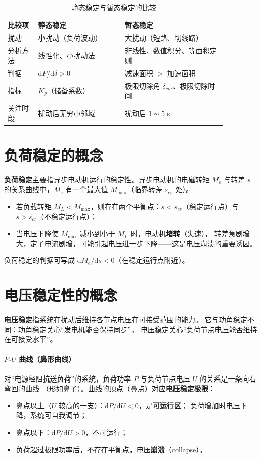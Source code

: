 \begin{table}[htbp]
  \centering
  \caption{静态稳定与暂态稳定的比较}
  \small
  \begin{tabular}{@{}p{0.12\linewidth}p{0.34\linewidth}p{0.40\linewidth}@{}}
    \toprule
    比较项 & 静态稳定 & 暂态稳定 \\
    \midrule
    扰动 & 小扰动（负荷波动） & 大扰动（短路、切线路） \\
    分析方法 & 线性化、小扰动法 & 非线性、数值积分、等面积定则 \\
    判据 & $\mathrm{d}P/\mathrm{d}\delta>0$ & 减速面积 $>$ 加速面积 \\
    指标 & $K_p$（储备系数） & 极限切除角 $\delta_{cm}$、极限切除时间 \\
    关注时段 & 扰动后无穷小邻域 & 扰动后 $1\sim5$ s \\
    \bottomrule
  \end{tabular}
\end{table}

\section{负荷稳定的概念}

\textbf{负荷稳定}主要指异步电动机运行的稳定性。异步电动机的电磁转矩 $M_e$ 与转差 $s$
的关系曲线中，$M_e$ 有一个最大值 $M_{\max}$（临界转差 $s_{cr}$ 处）。
\begin{itemize}
  \item 若负载转矩 $M_L<M_{\max}$，则存在两个平衡点：$s<s_{cr}$（稳定运行点）与
        $s>s_{cr}$（不稳定运行点）；
  \item 当电压下降使 $M_{\max}$ 减小到小于 $M_L$ 时，电动机\textbf{堵转}（失速），
        转差急剧增大，定子电流剧增，可能引起电压进一步下降——这是电压崩溃的重要诱因。
\end{itemize}
负荷稳定的判据可写成 $\mathrm{d}M_e/\mathrm{d}s<0$（在稳定运行点附近）。

\section{电压稳定性的概念}

\textbf{电压稳定}指系统在扰动后维持各节点电压在可接受范围的能力。
它与功角稳定不同：功角稳定关心“发电机能否保持同步”，
电压稳定关心“负荷节点电压能否维持在可接受水平”。

\paragraph{$P$-$U$ 曲线（鼻形曲线）}
对“电源经阻抗送负荷”的系统，负荷功率 $P$ 与负荷节点电压 $U$ 的关系是一条向右弯回的曲线
（形如鼻子）。曲线的顶点（鼻点）对应\textbf{电压稳定极限}：
\begin{itemize}
  \item 鼻点以上（$U$ 较高的一支）：$\mathrm{d}P/\mathrm{d}U<0$，是\textbf{可运行区}；
        负荷增加时电压下降，系统可自我调节；
  \item 鼻点以下：$\mathrm{d}P/\mathrm{d}U>0$，不可运行；
  \item 负荷超过极限功率后，不存在平衡点，电压\textbf{崩溃}（collapse）。
\end{itemize}

